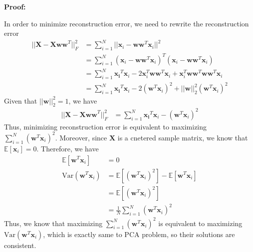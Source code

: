 \documentclass{article}
\newcommand{\E}{\mathbb{E}}
\newcommand{\Var}{\mathrm{Var}}
\renewcommand{\b}[1]{\bm{#1}}
\begin{document}
\begin{enumerate}
\begin{enumerate}
        {\bf Proof:}
        \par In order to minimize reconstruction error, we need to rewrite the reconstruction error
        \begin{align*}
            ||\b{X}-\b{Xww}^T||^2_F&=\sum_{i=1}^N||\b{x}_i-\b{ww}^T\b{x}_i||^2\\
            &=\sum_{i=1}^N (\b{x}_i-\b{ww}^T\b{x}_i)^T(\b{x}_i-\b{ww}^T\b{x}_i)\\
            &=\sum_{i=1}^N \b{x_i}^T\b{x}_i-2\b{x}_i^T\b{ww}^T\b{x}_i+\b{x}_i^T\b{ww}^T\b{ww}^T\b{x}_i\\
            &=\sum_{i=1}^N \b{x_i}^T\b{x}_i-2(\b{w}^T\b{x}_i)^2+||\b{w}||_2^2(\b{w}^T\b{x}_i)^2
        \end{align*}
        Given that $||\b{w}||_2^2=1$, we have 
        \begin{align*}
            ||\b{X}-\b{Xww}^T||^2_F&=\sum_{i=1}^N \b{x_i}^T\b{x}_i-(\b{w}^T\b{x}_i)^2
        \end{align*}
        Thus, minimizing reconstruction error is equivalent to maximizing $\sum_{i=1}^N (\b{w}^T\b{x}_i)^2$. Moreover, since $\b{X}$ is a cnetered sample matrix, we know that $\E[\b{x}_i]=0$. Therefore, we have 
        \begin{align*}
            \E[\b{w}^T\b{x}_i]&=0\\
            \Var(\b{w}^T\b{x}_i)&=\E[(\b{w}^T\b{x}_i)^2]-\E[\b{w}^T\b{x}_i]\\
            &=\E[(\b{w}^T\b{x}_i)^2]\\
            &=\frac{1}{N} \sum_{i=1}^N (\b{w}^T\b{x}_i)^2
        \end{align*}
        Thus, we know that maximizing $\sum_{i=1}^N (\b{w}^T\b{x}_i)^2$ is equivalent to maximizing $\Var(\b{w}^T\b{x}_i)$, which is exactly same to PCA problem, so their solutions are consistent.
    \end{enumerate}

    
\end{enumerate}
\end{document}
